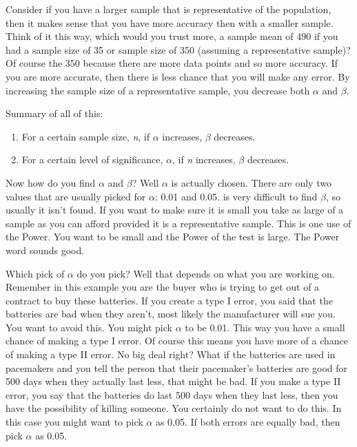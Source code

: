 \documentclass[
]{book}
\begin{document}
Consider if you have a larger sample that is representative of the population, then it makes sense that you have more accuracy then with a smaller sample. Think of it this way, which would you trust more, a sample mean of 490 if you had a sample size of 35 or sample size of 350 (assuming a representative sample)? Of course the 350 because there are more data points and so more accuracy. If you are more accurate, then there is less chance that you will make any error. By increasing the sample size of a representative sample, you decrease both \(\alpha\) and \(\beta\).

Summary of all of this:

\begin{enumerate}
\def\labelenumi{\arabic{enumi}.}
\item
  For a certain sample size, \emph{n}, if \(\alpha\) increases, \(\beta\) decreases.
\item
  For a certain level of significance, \(\alpha\), if \emph{n} increases, \(\beta\) decreases.
\end{enumerate}

Now how do you find \(\alpha\) and \(\beta\)? Well \(\alpha\) is actually chosen. There are only two values that are usually picked for \(\alpha\): 0.01 and 0.05. is very difficult to find \(\beta\), so usually it isn't found. If you want to make sure it is small you take as large of a sample as you can afford provided it is a representative sample. This is one use of the Power. You want to be small and the Power of the test is large. The Power word sounds good.

Which pick of \(\alpha\) do you pick? Well that depends on what you are working on. Remember in this example you are the buyer who is trying to get out of a contract to buy these batteries. If you create a type I error, you said that the batteries are bad when they aren't, most likely the manufacturer will sue you. You want to avoid this. You might pick \(\alpha\) to be 0.01. This way you have a small chance of making a type I error. Of course this means you have more of a chance of making a type II error. No big deal right? What if the batteries are used in pacemakers and you tell the person that their pacemaker's batteries are good for 500 days when they actually last less, that might be bad. If you make a type II error, you say that the batteries do last 500 days when they last less, then you have the possibility of killing someone. You certainly do not want to do this. In this case you might want to pick \(\alpha\) as 0.05. If both errors are equally bad, then pick \(\alpha\) as 0.05.
\end{document}
